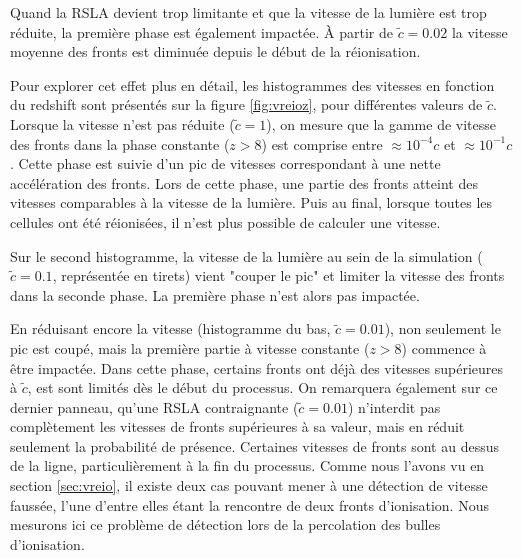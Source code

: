 Quand la \ac{RSLA} devient trop limitante et que la vitesse de la lumière est trop réduite, la première phase est également impactée.
À partir de $\tilde{c}=0.02$ la vitesse moyenne des fronts est diminuée depuis le début de la réionisation.

Pour explorer cet effet plus en détail, les histogrammes des vitesses en fonction du redshift sont présentés sur la figure \ref{fig:vreioz}, pour différentes valeurs de $\tilde{c}$.
Lorsque la vitesse n'est pas réduite ($\tilde{c}=1$), on mesure que la gamme de vitesse des fronts dans la phase constante ($z>8$) est comprise entre $\approx 10^{-4}c$ et $\approx 10^{-1}c$.
Cette phase est suivie d'un pic de vitesses correspondant à une nette accélération des fronts.
Lors de cette phase, une partie des fronts atteint des vitesses comparables à la vitesse de la lumière.
Puis au final, lorsque toutes les cellules ont été réionisées, il n'est plus possible de calculer une vitesse.

Sur le second histogramme, la vitesse de la lumière au sein de la simulation ($\tilde{c}=0.1$, représentée en tirets) vient "couper le pic" et limiter la vitesse des fronts dans la seconde phase.
La première phase n'est alors pas impactée.


En réduisant encore la vitesse (histogramme du bas, $\tilde{c}=0.01$), non seulement le pic est coupé, mais la première partie à vitesse constante ($z>8$) commence à être impactée.
Dans cette phase, certains fronts ont déjà des vitesses supérieures à $\tilde{c}$, est sont limités dès le début du processus.
On remarquera également sur ce dernier panneau, qu'une \ac{RSLA} contraignante ($\tilde{c}=0.01$) n'interdit pas complètement les vitesses de fronts supérieures à sa valeur, mais en réduit seulement la probabilité de présence.
Certaines vitesses de fronts sont au dessus de la ligne, particulièrement à la fin du processus.
Comme nous l'avons vu en section \ref{sec:vreio}, il existe deux cas pouvant mener à une détection de vitesse faussée, l'une d'entre elles étant la rencontre de deux fronts d'ionisation.
Nous mesurons ici ce problème de détection lors de la percolation des bulles d'ionisation.


